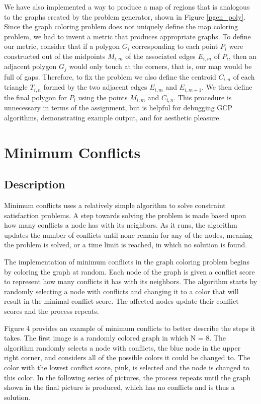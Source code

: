 \documentclass{article}
\begin{document}
	We have also implemented a way to produce a map of regions that is analogous to the graphs created by the problem generator, shown in Figure \ref{pgen_poly}.  
	Since the graph coloring problem does not uniquely define the map coloring problem, we had to invent a metric that produces appropriate graphs. To define our metric, consider that if a polygon $G_i$ corresponding to each point $P_i$ were constructed out of the midpoints $M_{i,m}$ of the associated edges $E_{i,m}$ of $P_i$, then an adjacent polygon $G_j$ would only touch at the corners, that is, our map would be full of gaps. Therefore, to fix the problem we also define the centroid $C_{i,n}$ of each triangle $T_{i,n}$ formed by the two adjacent edges $E_{i,m}$ and $E_{i,m+1}$. We then define the final polygon for $P_i$ using the points $M_{i,m}$ and $C_{i,n}$. This procedure is unnecessary in terms of the assignment, but is helpful for debugging GCP algorithms, demonstrating example output, and for aesthetic pleasure.
		
\section{Minimum Conflicts}
	\subsection{Description}
		
		Minimum conflicts uses a relatively simple algorithm to solve constraint satisfaction problems.  A step towards solving the problem is made based upon how many conflicts a node has with its neighbors.  As it runs, the algorithm updates the number of conflicts until none remain for any of the nodes, meaning the problem is solved, or a time limit is reached, in which no solution is found.
		
		The implementation of minimum conflicts in the graph coloring problem begins by coloring the graph at random.  Each node of the graph is given a conflict score to represent how many conflicts it has with its neighbors.  The algorithm starts by randomly selecting a node with conflicts and changing it to a color that will result in the minimal conflict score.  The affected nodes update their conflict scores and the process repeats.

		Figure 4 provides an example of minimum conflicts to better describe the steps it takes.  The first image is a randomly colored graph in which N = 8.  The algorithm randomly selects a node with conflicts, the blue node in the upper right corner, and considers all of the possible colors it could be changed to.  The color with the lowest conflict score, pink, is selected and the node is changed to this color.  In the following series of pictures, the process repeats until the graph shown in the final picture is produced, which has no conflicts and is thus a solution.
		
\end{document}
